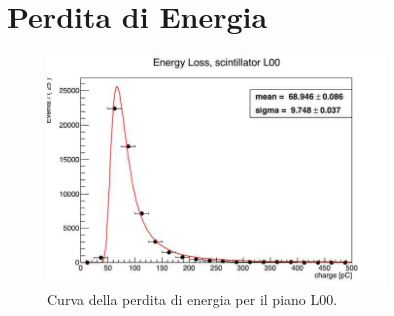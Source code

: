 \begin{figure}[H]
  \quad
  \\
  \caption{}
  \label{fig:tdc2}
\end{figure}


\chapter{Perdita di Energia}             %

\begin{figure}[H]
  \centering
  \includegraphics[width=0.8\textwidth]{plots/energy_L00.jpg}
  \caption{Curva della perdita di energia per il piano L00.}
  \label{fig:l00}
\end{figure}

